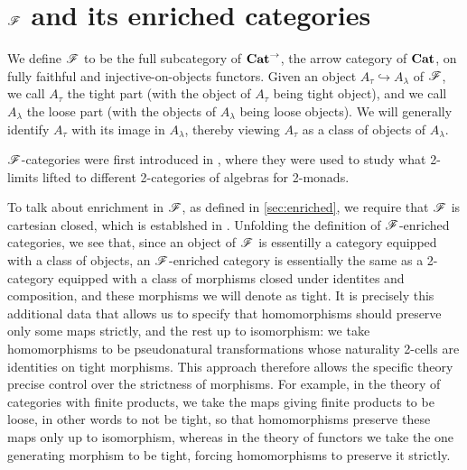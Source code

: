 \documentclass[../thesis.tex]{subfiles}
\begin{document}
\section{\texorpdfstring{${\mathscr{F}}$}{F} and its enriched categories}\label{sec:F and cats}
\begin{definition}\label{def:F}
  We define ${\mathscr{F}}$ to be the full subcategory of ${\mathbf{Cat}}^\to$, the arrow category of ${\mathbf{Cat}}$, on fully faithful and
  injective-on-objects functors. Given an object $A_\tau \hookrightarrow A_\lambda$ of ${\mathscr{F}}$, we call $A_\tau$ the
  tight part (with the object of $A_\tau$ being tight object), and we call $A_\lambda$ the loose part (with the objects
  of $A_\lambda$ being loose objects). We will generally identify $A_\tau$ with its image in $A_\lambda$, thereby
  viewing $A_\tau$ as a class of objects of $A_\lambda$.
\end{definition}
\begin{remark}
  ${\mathscr{F}}$-categories were first introduced in \cite{lack2012}, where they were used to study what 2-limits
  lifted to different 2-categories of algebras for 2-monads.
\end{remark}
To talk about enrichment in ${\mathscr{F}}$, as defined in \cref{sec:enriched}, we require that ${\mathscr{F}}$ is cartesian closed, which is
establshed in \cite[§3.1]{lack2012}. Unfolding the definition of ${\mathscr{F}}$-enriched categories, we see that, since an object
of ${\mathscr{F}}$ is essentilly a category equipped with a class of objects, an ${\mathscr{F}}$-enriched category is essentially the same
as a 2-category equipped with a class of morphisms closed under identites and composition, and these morphisms we
will denote as tight. It is precisely this additional data that allows us to specify that homomorphisms should preserve
only some maps strictly, and the rest up to isomorphism: we take homomorphisms to be pseudonatural transformations whose
naturality 2-cells are identities on tight morphisms. This approach therefore allows the specific theory precise control over
the strictness of morphisms. For example, in the theory of categories with finite products, we take the maps giving finite
products to be loose, in other words to not be tight, so that homomorphisms preserve these maps only up to isomorphism,
whereas in the theory of functors we take the one generating morphism to be tight, forcing homomorphisms to preserve it strictly.
\end{document}
